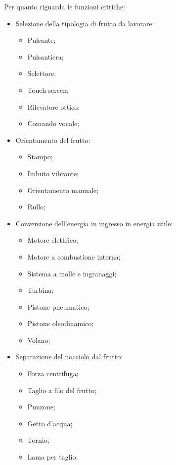 \documentclass[12pt,a4paper,twoside]{report}  %
\begin{document}
Per quanto riguarda le funzioni critiche:
\begin{itemize}
\item Selezione della tipologia di frutto da  lavorare:
  \begin{itemize}
  \item Pulsante;
  \item Pulsantiera;
  \item Selettore;
  \item Touch-screen;
  \item Rilevatore ottico;
  \item Comando vocale;
  \end{itemize}  
\item Orientamento del frutto:
  \begin{itemize}
  \item Stampo;
  \item Imbuto vibrante;
  \item Orientamento manuale;
  \item Rullo;
  \end{itemize} 
\item Conversione dell'energia in ingresso in energia utile:
  \begin{itemize}
  \item Motore elettrico;
  \item Motore a combustione interna;
  \item Sistema a molle e ingranaggi;
  \item Turbina;
  \item Pistone pneumatico;
  \item Pistone oleodinamico;
  \item Volano;
  \end{itemize}
\item Separazione del nocciolo dal frutto:
  \begin{itemize}
  \item Forza centrifuga;
  \item Taglio a filo del frutto;
  \item Punzone;
  \item Getto d'acqua;
  \item Tornio;
  \item Lama per taglio;
  \end{itemize}
\end{itemize}
\end{document}
